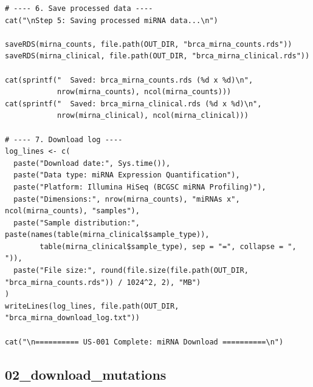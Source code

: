 \documentclass[12pt,a4paper]{ctexart}
\begin{document}
\begin{lstlisting}[caption={02_download_mirna}, basicstyle=\ttfamily\scriptsize]
# ---- 6. Save processed data ----
cat("\nStep 5: Saving processed miRNA data...\n")

saveRDS(mirna_counts, file.path(OUT_DIR, "brca_mirna_counts.rds"))
saveRDS(mirna_clinical, file.path(OUT_DIR, "brca_mirna_clinical.rds"))

cat(sprintf("  Saved: brca_mirna_counts.rds (%d x %d)\n",
            nrow(mirna_counts), ncol(mirna_counts)))
cat(sprintf("  Saved: brca_mirna_clinical.rds (%d x %d)\n",
            nrow(mirna_clinical), ncol(mirna_clinical)))

# ---- 7. Download log ----
log_lines <- c(
  paste("Download date:", Sys.time()),
  paste("Data type: miRNA Expression Quantification"),
  paste("Platform: Illumina HiSeq (BCGSC miRNA Profiling)"),
  paste("Dimensions:", nrow(mirna_counts), "miRNAs x", ncol(mirna_counts), "samples"),
  paste("Sample distribution:", paste(names(table(mirna_clinical$sample_type)),
        table(mirna_clinical$sample_type), sep = "=", collapse = ", ")),
  paste("File size:", round(file.size(file.path(OUT_DIR, "brca_mirna_counts.rds")) / 1024^2, 2), "MB")
)
writeLines(log_lines, file.path(OUT_DIR, "brca_mirna_download_log.txt"))

cat("\n========== US-001 Complete: miRNA Download ==========\n")
\end{lstlisting}

\subsection{02_download_mutations}
\end{document}
